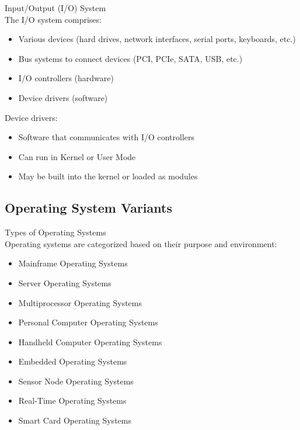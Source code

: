\begin{definition}{Input/Output (I/O) System}\\
    The I/O system comprises:
    \begin{itemize}
        \item Various devices (hard drives, network interfaces, serial ports, keyboards, etc.)
        \item Bus systems to connect devices (PCI, PCIe, SATA, USB, etc.)
        \item I/O controllers (hardware)
        \item Device drivers (software)
    \end{itemize}
    
    Device drivers:
    \begin{itemize}
        \item Software that communicates with I/O controllers
        \item Can run in Kernel or User Mode
        \item May be built into the kernel or loaded as modules
    \end{itemize}
\end{definition}

\subsection{Operating System Variants}

\begin{definition}{Types of Operating Systems}\\
    Operating systems are categorized based on their purpose and environment:
    \begin{itemize}
        \item Mainframe Operating Systems
        \item Server Operating Systems
        \item Multiprocessor Operating Systems
        \item Personal Computer Operating Systems
        \item Handheld Computer Operating Systems
        \item Embedded Operating Systems
        \item Sensor Node Operating Systems
        \item Real-Time Operating Systems
        \item Smart Card Operating Systems
    \end{itemize}
\end{definition}

